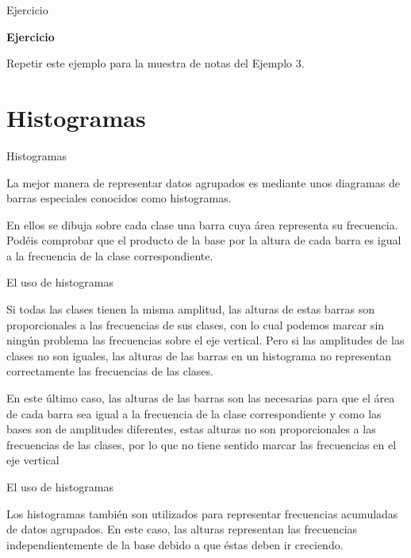 \documentclass[
  ignorenonframetext,
]{beamer}
\begin{document}
\begin{frame}{Ejercicio}
\protect\hypertarget{ejercicio-1}{}

\textbf{Ejercicio}

Repetir este ejemplo para la muestra de notas del Ejemplo 3.

\end{frame}

\hypertarget{histogramas}{%
\section{Histogramas}\label{histogramas}}

\begin{frame}{Histogramas}
\protect\hypertarget{histogramas-1}{}

La mejor manera de representar datos agrupados es mediante unos
diagramas de barras especiales conocidos como histogramas.

En ellos se dibuja sobre cada clase una barra cuya área representa su
frecuencia. Podéis comprobar que el producto de la base por la altura de
cada barra es igual a la frecuencia de la clase correspondiente.

\end{frame}

\begin{frame}{El uso de histogramas}
\protect\hypertarget{el-uso-de-histogramas}{}

Si todas las clases tienen la misma amplitud, las alturas de estas
barras son proporcionales a las frecuencias de sus clases, con lo cual
podemos marcar sin ningún problema las frecuencias sobre el eje
vertical. Pero si las amplitudes de las clases no son iguales, las
alturas de las barras en un histograma no representan correctamente las
frecuencias de las clases.

En este último caso, las alturas de las barras son las necesarias para
que el área de cada barra sea igual a la frecuencia de la clase
correspondiente y como las bases son de amplitudes diferentes, estas
alturas no son proporcionales a las frecuencias de las clases, por lo
que no tiene sentido marcar las frecuencias en el eje vertical

\end{frame}

\begin{frame}{El uso de histogramas}
\protect\hypertarget{el-uso-de-histogramas-1}{}

Los histogramas también son utilizados para representar frecuencias
acumuladas de datos agrupados. En este caso, las alturas representan las
frecuencias independientemente de la base debido a que éstas deben ir
creciendo.

\end{frame}
\end{document}
